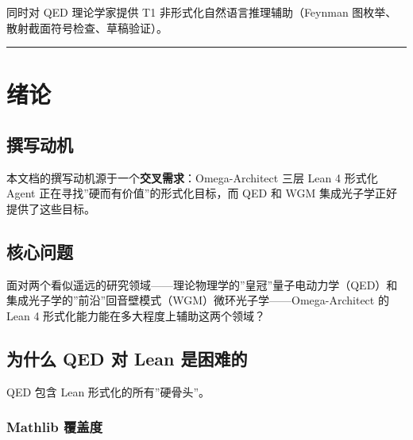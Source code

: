 \documentclass[
  11pt,
  a4paper,
]{ctexrep}
\begin{document}
同时对 QED 理论学家提供 T1 非形式化自然语言推理辅助（Feynman
图枚举、散射截面符号检查、草稿验证）。

\begin{center}\rule{0.5\linewidth}{0.5pt}\end{center}


\chapter*{绪论}\label{ux7eeaux8bba}


\section*{撰写动机}\label{ux64b0ux5199ux52a8ux673a}


本文档的撰写动机源于一个\textbf{交叉需求}：Omega-Architect 三层 Lean 4
形式化 Agent 正在寻找''硬而有价值''的形式化目标，而 QED 和 WGM
集成光子学正好提供了这些目标。

\section*{核心问题}\label{ux6838ux5fc3ux95eeux9898}


面对两个看似遥远的研究领域------理论物理学的''皇冠''量子电动力学（QED）和集成光子学的''前沿''回音壁模式（WGM）微环光子学------Omega-Architect
的 Lean 4 形式化能力能在多大程度上辅助这两个领域？

\section*{为什么 QED 对 Lean
是困难的}\label{ux4e3aux4ec0ux4e48-qed-ux5bf9-lean-ux662fux56f0ux96beux7684}


QED 包含 Lean 形式化的所有''硬骨头''。

\subsection*{Mathlib 覆盖度}\label{mathlib-ux8986ux76d6ux5ea6}
\end{document}
